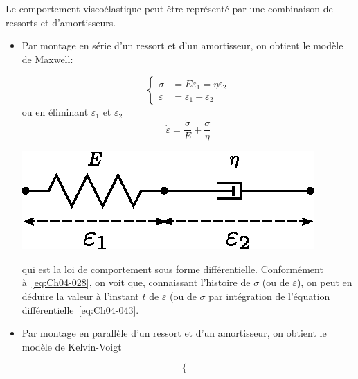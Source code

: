 Le comportement viscoélastique peut être représenté par une combinaison de ressorts et d'amortisseurs. 
\begin{itemize}
    \item Par montage en série d'un ressort et d'un amortisseur, on obtient le modèle de Maxwell:
        \begin{multicols}{2}
            \begin{equation}
                \left\{
                \begin{aligned}
                    \sigma &= E \varepsilon_1 = \eta \dot{\varepsilon}_2 \\
                    \varepsilon &= \varepsilon_1 + \varepsilon_2
                \end{aligned}
                \right.
                \label{eq:Ch04-042}
            \end{equation}
            ou en éliminant $\varepsilon_1$ et $\varepsilon_2$
            \begin{equation}
                \dot \varepsilon = \frac{\dot \sigma}{E} + \frac{\sigma}{\eta}
                \label{eq:Ch04-043}
            \end{equation}
            \columnbreak
            \begin{center}
                \includegraphics{../images/T1_Ch04-0025}
            \end{center}
        \end{multicols}
        qui est la loi de comportement sous forme différentielle.
        Conformément à~\eqref{eq:Ch04-028}, on voit que, connaissant l'histoire de $\sigma$ (ou de $\varepsilon$), on peut en déduire la valeur à l'instant $t$ de $\varepsilon$ (ou de $\sigma$ par intégration de l'équation différentielle~\eqref{eq:Ch04-043}.
    \item Par montage en parallèle d'un ressort et d'un amortisseur, on obtient le modèle de Kelvin-Voigt
        \begin{multicols}{2}
            \begin{equation}
                \left\{
                \begin{aligned}

\end{aligned}
\end{equation}
\end{multicols}
\end{itemize}
